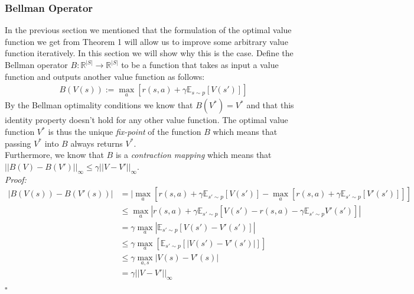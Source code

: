 \subsubsection{Bellman Operator}
In the previous section we mentioned that the formulation of the optimal value function we get from Theorem 1 will allow us to improve some arbitrary value function iteratively. In this section we will show why this is the case. Define the Bellman operator $B: \mathbb{R}^{|S|} \rightarrow \mathbb{R}^{|S|}$ to be a function that takes as input a value function and outputs another value function as follows:
\begin{align*}
    B(V(s)):= \max_a[r(s, a) + \gamma \mathbb{E}_{s \sim p}[V(s')]]
\end{align*}
By the Bellman optimality conditions we know that $B(V^*) = V^*$ and that this identity property doesn't hold for any other value function. The optimal value function $V^*$ is thus the unique \textit{fix-point} of the function $B$ which means that passing $V^*$ into $B$ always returns $V^*$.\\

\noindent Furthermore, we know that $B$ is a \textit{contraction mapping} which means that $||B(V) - B(V')||_\infty \leq \gamma||V - V'||_\infty$.\\ 
\textit{Proof:} 
\begin{align*}
    |B(V(s)) - B(V'(s))| &= |\max_a[r(s, a) + \gamma \mathbb{E}_{s' \sim p}[V(s')] - \max_a[r(s, a) + \gamma \mathbb{E}_{s' \sim p}[V'(s')]]]\\
    & \leq \max_a |r(s, a) + \gamma \mathbb{E}_{s' \sim p}[V(s') - r(s, a) - \gamma \mathbb{E}_{s' \sim p}V'(s')]|\\
    &= \gamma \max_a |\mathbb{E}_{s' \sim p}[V(s') - V'(s')]|\\
    & \leq \gamma \max_a [\mathbb{E}_{s' \sim p}[|V(s') - V'(s')|]]\\
    & \leq \gamma \max_{a, s} |V(s) - V'(s)|\\
    &= \gamma ||V - V'||_\infty
\end{align*} $\square$

